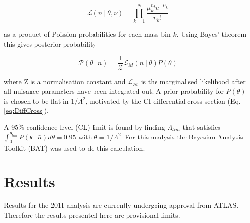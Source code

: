 	\begin{equation}
	        \mathcal{L} (\bar{n}~|~\theta,\bar{\nu}) = \prod_{k=1}^{N} \frac{ \mu_{k}^{n_{k}} e^{-\mu_{k}} }{n_{k}!}
	\end{equation}

	as a product of Poission probabilities for each mass bin $k$. Using Bayes' theorem this gives posterior probability

	\begin{equation}
	        \mathcal{P}(\theta~|~\bar{n}) = \frac{1}{\mathcal{Z}} \mathcal{L}_{M}(\bar{n}~|~\theta)P(\theta)
	\end{equation}

	where Z is a normalisation constant and $\mathcal{L_{M}}$ is the marginalised likelihood after all nuisance parameters have been integrated out. A prior probability for $P(\theta)$ is chosen to be flat in $1/\Lambda^{2}$, motivated by the CI differential cross-section (Eq. \ref{eq:DiffCross}).

	A 95\% confidence level (CL) limit is found by finding $\Lambda_{lim}$ that satisfies $\int_{0} ^{\theta_{lim}} P(\theta~|~\bar{n}) d\theta = 0.95$ with $\theta = 1/\Lambda^{2}$. For this analysis the Bayesian Analysis Toolkit (BAT) \cite{BAT} was used to do this calculation. 









\section{Results}

	Results for the 2011 analysis are currently undergoing approval from ATLAS. Therefore the results presented here are provisional limits. 

